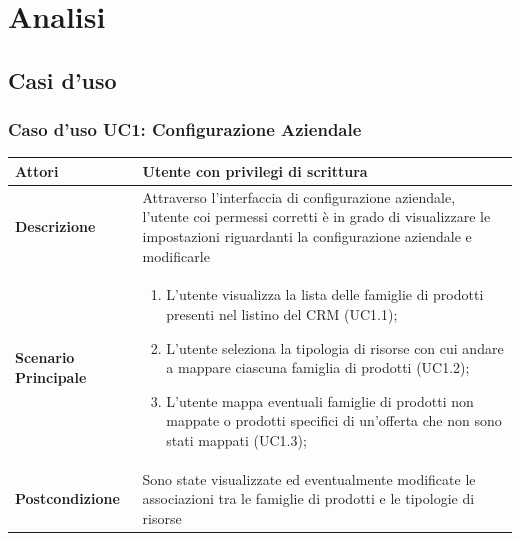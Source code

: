 \documentclass[12pt,a4paper,twoside,openright,english]{book}
\begin{document}
\chapter{Analisi}\label{analisi}

\section{Casi d'uso}\label{usecase}

\begin{small}

	\hypertarget{UC1}{}
	\subsection{Caso d'uso UC1: Configurazione Aziendale}
	\begin{longtable}{ | p{2.7cm} | p{12cm} |}
		\hline \textbf{Attori} & Utente con privilegi di scrittura\\ 
		\hline \textbf{Descrizione} & Attraverso l’interfaccia di configurazione aziendale, l’utente coi permessi corretti è in grado di visualizzare le impostazioni riguardanti la configurazione aziendale e modificarle\\ 
		\hline \textbf{Scenario Principale} & \begin{enumerate}
			\item L’utente visualizza la lista delle famiglie di prodotti presenti nel listino del CRM  (UC1.1);
			\item L’utente seleziona la tipologia di risorse con cui andare a mappare ciascuna famiglia di prodotti  (UC1.2);
			\item L’utente mappa eventuali famiglie di prodotti non mappate o prodotti specifici di un’offerta che non sono stati mappati  (UC1.3);
			
		\end{enumerate}
		\\ 
		\hline \textbf{Postcondizione} & Sono state visualizzate ed eventualmente modificate le associazioni tra le famiglie di prodotti e le tipologie di risorse\\ 
		\hline 
	\end{longtable}
	
	\hypertarget{UC1.2}{}

\end{small}
\end{document}
